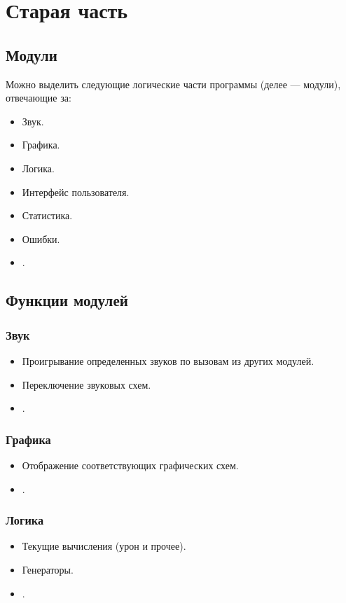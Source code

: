 \documentclass[12pt,a4paper,fullpage]{article}
\begin{document}
\newpage
\section{Старая часть}
\subsection{Модули}

Можно выделить следующие логические части программы (делее --- модули), отвечающие за:
\begin{itemize}
	\item Звук.
	\item Графика.
	\item Логика.
	\item Интерфейс пользователя.
	\item Статистика.
	\item Ошибки.
	\item .\\
\end{itemize}

\subsection{Функции модулей}
\subsubsection{Звук}
\begin{itemize}
	\item Проигрывание определенных звуков по вызовам из других модулей.
	\item Переключение звуковых схем.
	\item .\\
\end{itemize}

\subsubsection{Графика}
\begin{itemize}
	\item Отображение соответствующих графических схем.
	\item .\\
\end{itemize}

\subsubsection{Логика}
\begin{itemize}
	\item Текущие вычисления (урон и прочее).
	\item Генераторы.
	\item .\\
\end{itemize}
\end{document}
